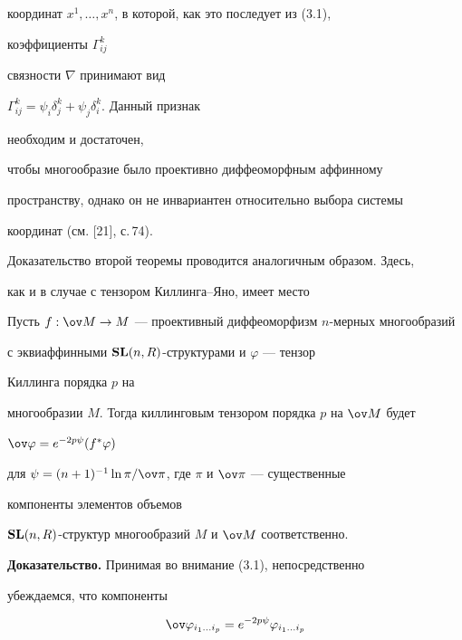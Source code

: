 координат $x^1,\dotsc,x^n$, в которой, как это последует из (3.1), 


коэффициенты $\Gamma^k_{ij}$ 


связности $\nabla$ принимают вид 


$\Gamma^k_{ij}=\psi_i\delta^k_j+\psi_j\delta^k_i$. Данный признак 


необходим и достаточен, 


чтобы многообразие было проективно диффеоморфным аффинному 


пространству, однако он не инвариантен относительно выбора системы 


координат (см. [21], с.\,74). 


 


Доказательство второй теоремы проводится аналогичным образом. Здесь, 


как и в случае с тензором Киллинга--Яно, имеет место 


 


 


\begin{lem} 


Пусть $f:\ov M\to M$ --- проективный диффеоморфизм $n$-мерных многообразий 


с эквиаффинными $\bold {SL}(n,R)$-структурами и $\varphi$ --- тензор 


Киллинга порядка $p$ на 


многообразии $M$. Тогда киллинговым тензором порядка $p$ на $\ov M$ будет 


$\ov\varphi=e^{-2p\psi}(f^*\varphi)$ 


для $\psi=(n+1)^{-1}\ln\pi/\ov\pi$, где $\pi$ и $\ov\pi$ --- существенные 


компоненты элементов объемов 


$\bold {SL}(n,R)$-структур многообразий $M$ и $\ov M$ соответственно. 


\end{lem} 


 


 


{\bf Доказательство.} Принимая во внимание (3.1), непосредственно 


убеждаемся, что компоненты 


\begin{equation} 


\ov\varphi_{i_1\dotsc i_p}=e^{-2p\psi}\varphi_{i_1\dotsc i_p} 


\end{equation} 


